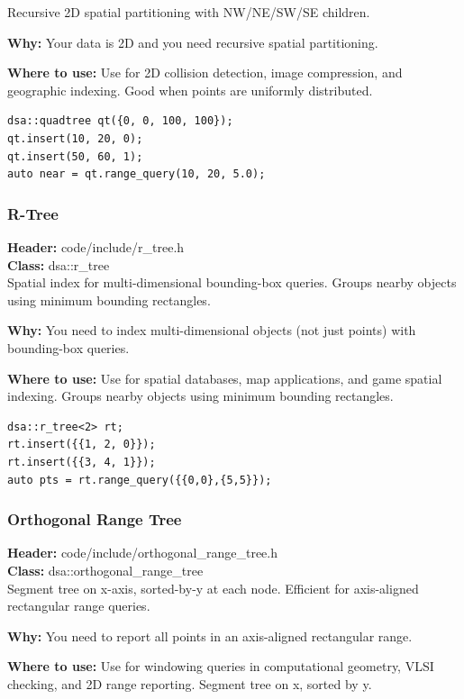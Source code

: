 \documentclass[11pt]{article}
\begin{document}
Recursive 2D spatial partitioning with NW/NE/SW/SE children.

\textbf{Why:} Your data is 2D and you need recursive spatial partitioning. \par \textbf{Where to use:} Use for 2D collision detection, image compression, and geographic indexing. Good when points are uniformly distributed.

\begin{lstlisting}
dsa::quadtree qt({0, 0, 100, 100});
qt.insert(10, 20, 0);
qt.insert(50, 60, 1);
auto near = qt.range_query(10, 20, 5.0);
\end{lstlisting}

\subsubsection{R-Tree}
\textbf{Header:} code/include/r\_tree.h\\
\textbf{Class:} dsa::r\_tree\\

Spatial index for multi-dimensional bounding-box queries. Groups nearby objects using minimum bounding rectangles.

\textbf{Why:} You need to index multi-dimensional objects (not just points) with bounding-box queries. \par \textbf{Where to use:} Use for spatial databases, map applications, and game spatial indexing. Groups nearby objects using minimum bounding rectangles.

\begin{lstlisting}
dsa::r_tree<2> rt;
rt.insert({{1, 2, 0}});
rt.insert({{3, 4, 1}});
auto pts = rt.range_query({{0,0},{5,5}});
\end{lstlisting}

\subsubsection{Orthogonal Range Tree}
\textbf{Header:} code/include/orthogonal\_range\_tree.h\\
\textbf{Class:} dsa::orthogonal\_range\_tree\\

Segment tree on x-axis, sorted-by-y at each node. Efficient for axis-aligned rectangular range queries.

\textbf{Why:} You need to report all points in an axis-aligned rectangular range. \par \textbf{Where to use:} Use for windowing queries in computational geometry, VLSI checking, and 2D range reporting. Segment tree on x, sorted by y.
\end{document}
